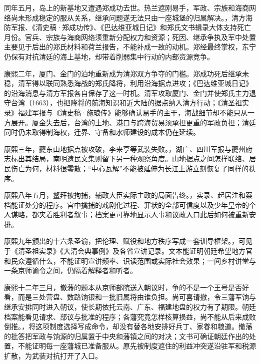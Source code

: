 同年五月，岛上的新基地又遭遇郑成功去世。热兰遮刚易手，军政、宗族和海商网络尚未形成稳定的服从关系，继承问题遂无法只由一座城堡的归属解决。，清方海防军报、《清史稿·郑成功传》、《巴达维亚城日记》和郑氏文书辑录大体支持死亡月份。官兵、宗族与海商网络须重新分配权力和资源；死因、继承争执及军中处置主要见于后出的郑氏材料和荷兰报告，不能补成一致的动机。郑经最终掌权，东宁仍保有对抗清廷的海上基地，却带着削弱集中行动的内部资源竞争。

康熙二年，厦门、金门的泊地重新成为清郑双方争夺的门槛。郑成功死后继承未稳，清军得以联同熟悉海战的郑氏降将，利用沿海据点进攻；《巴达维亚城日记》的沿海消息与清方军报各自保存了这一时机。清军攻取厦门、金门并使郑氏主力退守台湾（1663），也把降将的航海知识和近大陆的据点纳入清方行动；《清圣祖实录》福建军报与《清史稿·施琅传》能够确认易手的主干，海战细节却不能只从一方展开。厦金失去后，台湾的土地、港口与跨海贸易须承担更重的军政负担；清廷同时仍未取得制海权，迁界、守备和水师建设的成本仍在延续。

康熙三年，夔东山地据点被攻破，李来亨等武装失败。，湖广、四川军报与夔州府志标出其结局，南明遗民文集则留下另一种观察角度。山地据点之间怎样联络、居民伤亡为何，材料很零散；“中心瓦解”不能被延伸为长江上游立刻恢复了同样的秩序。

康熙八年五月，鳌拜被拘捕，辅政大臣实际主政的局面告终。，实录、起居注和案档能证处分的程序。宫中擒捕的戏剧化过程、罪状的全部可信度以及少年皇帝的个人谋略，都夹着胜利者叙事；档案更可靠地显示人事和议政入口此后如何被重新安排。

康熙九年颁出的十六条圣谕，把伦理、赋役和地方秩序写成一套训导框架。，可见于《清圣祖实录》《大清会典事例》及各省宣讲记录。文本能证明朝廷希望地方官和民众遵循什么，不能证明宣讲频率、识读范围或实际社会效果；一间乡村讲堂与一条京师谕令之间，仍隔着解释者和听者。

康熙十二年三月，撤藩的题本从京师部院送入朝议时，争的不是一个王号是否好看，而是三处营盘、数路饷银和一批旧属将由谁负担。尚可喜请撤，令三藩军饷与继承安排同时进入朝议，使长期依托云南、广东、福建地盘的权力有了期限。朝廷档案能看见请求、部议与批准的程序；各藩究竟怎样核算损益，尚不能从后来成败倒推。，将这项制度选择写成命令，却没有替各地安排好兵丁、家眷和粮道。撤藩的批答把军政与饷源的归属置于中央和藩镇之间的对决；文书可确证朝廷作出的处置，不能证明每一座藩城已准备服从。原先被制度遮住的利益冲突遂沿驻军和税源扩散，为武装对抗打开了入口。

